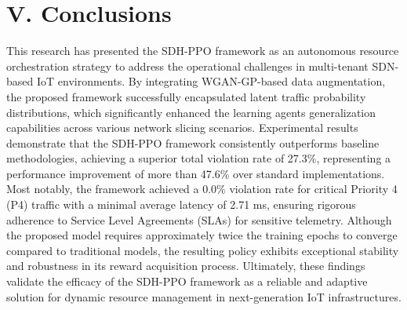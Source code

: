 \section{V. Conclusions}\label{v.-conclusions}

This research has presented the SDH-PPO framework as an autonomous resource orchestration strategy to address the operational challenges in multi-tenant SDN-based IoT environments. By integrating WGAN-GP-based data augmentation, the proposed framework successfully encapsulated latent traffic probability distributions, which significantly enhanced the learning agent\textquotesingle s generalization capabilities across various network slicing scenarios. Experimental results demonstrate that the SDH-PPO framework consistently outperforms baseline methodologies, achieving a superior total violation rate of 27.3\%, representing a performance improvement of more than 47.6\% over standard implementations. Most notably, the framework achieved a 0.0\% violation rate for critical Priority 4 (P4) traffic with a minimal average latency of 2.71 ms, ensuring rigorous adherence to Service Level Agreements (SLAs) for sensitive telemetry. Although the proposed model requires approximately twice the training epochs to converge compared to traditional models, the resulting policy exhibits exceptional stability and robustness in its reward acquisition process. Ultimately, these findings validate the efficacy of the SDH-PPO framework as a reliable and adaptive solution for dynamic resource management in next-generation IoT infrastructures.